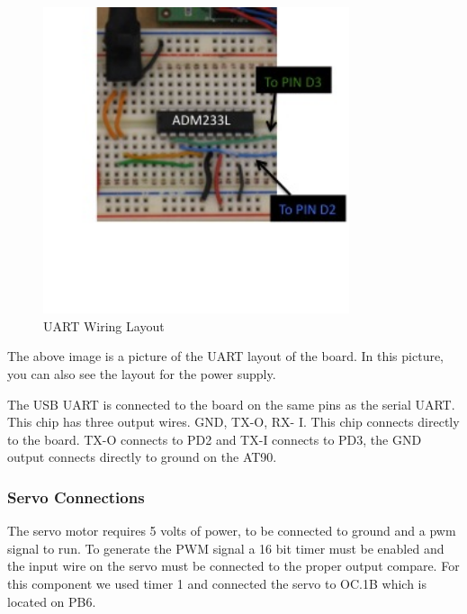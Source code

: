 \begin{figure}[h]
  \begin{center}
    \includegraphics[width=90mm]{imageSources/uartConnect3.png}
  \end{center}
  \caption{UART Wiring Layout} 
  \label{uartConnect3}
\end{figure}

The above image is a picture of the UART layout of the board. In this picture, you can also see the layout for the power supply.

The USB UART is connected to the board on the same pins as the serial UART.  This chip has three output wires.  GND, TX-O, RX- I. This chip connects directly to the board. TX-O connects to PD2 and TX-I connects to PD3, the GND output connects directly to ground on the AT90.

\subsubsection{Servo Connections}
The servo motor requires 5 volts of power, to be connected to ground and a pwm signal to run. To generate the PWM signal a 16 bit timer must be enabled and the input wire on the servo must be connected to the proper output compare. For this component we used timer 1 and connected the servo to OC.1B which is located on PB6.


